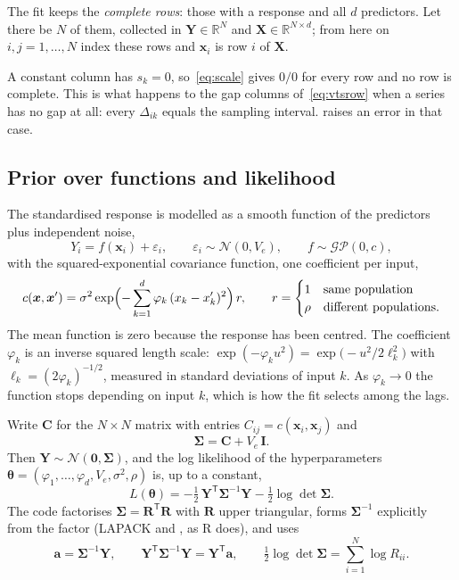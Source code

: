\documentclass[11pt,a4paper]{article}
\newcommand{\code}[1]{\texttt{\detokenize{#1}}}
\newcommand{\T}{^{\mathsf T}}
\newcommand{\R}{\mathbb{R}}
\newcommand{\Sig}{\bm{\Sigma}}
\newcommand{\Siginv}{\bm{\Sigma}^{-1}}
\newcommand{\ve}{V_e}
\numberwithin{equation}{section}
\begin{document}
The fit keeps the \emph{complete rows}: those with a response and all $d$ predictors. Let there
be $N$ of them, collected in $\bm{Y}\in\R^N$ and $\bm{X}\in\R^{N\times d}$; from here on
$i,j=1,\dots,N$ index these rows and $\bm{x}_i$ is row $i$ of $\bm{X}$.

A constant column has $s_k=0$, so~\eqref{eq:scale} gives $0/0$ for every row and no row is
complete. This is what happens to the gap columns of~\eqref{eq:vtsrow} when a series has no gap at
all: every $\Delta_{ik}$ equals the sampling interval. \code{gpedm_py} raises an error in that case.

\subsection{Prior over functions and likelihood}
The standardised response is modelled as a smooth function of the predictors plus independent noise,
\begin{equation}
Y_i=f(\bm{x}_i)+\varepsilon_i,\qquad \varepsilon_i\sim\mathcal N(0,\ve),\qquad f\sim\mathcal{GP}(0,c),
\end{equation}
with the squared-exponential covariance function, one coefficient per input,
\begin{equation}
c(\bm{x},\bm{x}')=\sigma^2\exp\Bigl(-\sum_{k=1}^{d}\varphi_k\,(x_k-x'_k)^2\Bigr)\,r,
\qquad
r=\begin{cases}1 & \text{same population}\\ \rho & \text{different populations.}\end{cases}
\label{eq:cov}
\end{equation}
The mean function is zero because the response has been centred. The coefficient $\varphi_k$ is an
inverse squared length scale: $\exp(-\varphi_k u^2)=\exp\bigl(-u^2/2\ell_k^2\bigr)$ with
$\ell_k=(2\varphi_k)^{-1/2}$, measured in standard deviations of input $k$. As $\varphi_k\to0$ the
function stops depending on input $k$, which is how the fit selects among the lags.

Write $\bm{C}$ for the $N\times N$ matrix with entries $C_{ij}=c(\bm{x}_i,\bm{x}_j)$ and
\begin{equation}
\Sig=\bm{C}+\ve\,\bm{I}.
\end{equation}
Then $\bm{Y}\sim\mathcal N(\bm 0,\Sig)$, and the log likelihood of the hyperparameters
$\bm\theta=(\varphi_1,\dots,\varphi_d,\ve,\sigma^2,\rho)$ is, up to a constant,
\begin{equation}
L(\bm\theta)=-\tfrac12\,\bm{Y}\T\Siginv\bm{Y}-\tfrac12\log\det\Sig .
\label{eq:loglik}
\end{equation}
The code factorises $\Sig=\bm{R}\T\bm{R}$ with $\bm{R}$ upper triangular, forms $\Siginv$
explicitly from the factor (LAPACK \code{dpotrf} and \code{dpotri}, as R does), and uses
\begin{equation}
\bm{a}=\Siginv\bm{Y},\qquad \bm{Y}\T\Siginv\bm{Y}=\bm{Y}\T\bm{a},\qquad
\tfrac12\log\det\Sig=\sum_{i=1}^{N}\log R_{ii}.
\end{equation}
\end{document}
